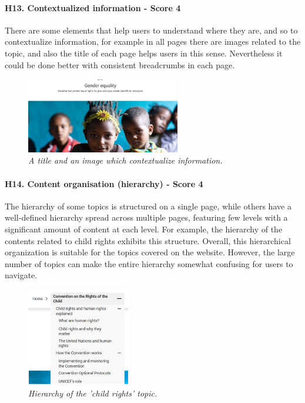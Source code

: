 \paragraph{H13. Contextualized information - Score 4}	There are some elements that help users to understand where they are, and so to contextualize information, for example in all pages there are images related to the topic, and also the title of each page helps users in this sense. Nevertheless it could be done better with consistent breadcrumbs in each page.
\begin{figure}[!h]
	\begin{center}
		\includegraphics[width=0.6\textwidth]{Picture9.jpg}
		\captionsetup{font=small}
		\caption{\textit{A title and an image which contextualize information.}}
	\end{center}
\end{figure}
\newline
\paragraph{H14. Content organisation (hierarchy) - Score 4}	The hierarchy of some topics is structured on a single page, while others have a well-defined hierarchy spread across multiple pages, featuring few levels with a significant amount of content at each level. For example, the hierarchy of the contents related to child rights exhibits this structure.
\newline Overall, this hierarchical organization is suitable for the topics covered on the website. However, the large number of topics can make the entire hierarchy somewhat confusing for users to navigate.
\begin{figure}[!h]
	\begin{center}
		\includegraphics[width=0.4\textwidth]{Picture10.jpg}
		\captionsetup{font=small}
		\caption{\textit{Hierarchy of the 'child rights' topic.}}
	\end{center}
\end{figure}
\newline
